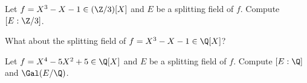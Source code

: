 \begin{exercise}
\label{xca:dec field of X^3-X-1 over Z3}
    Let $f=X^3-X-1\in (\Z/3)[X]$ and $E$ be a splitting field of $f$. 
    Compute $[E:\Z/3]$. 
\end{exercise}

What about the splitting field of $f=X^3-X-1\in \Q[X]$?

\begin{exercise}
\label{xca:dec field X^4-5X^2+5}
    Let $f=X^4-5X^2+5\in \Q[X]$ and $E$ be a splitting field of $f$. 
    Compute $[E:\Q]$ and $\Gal(E/\Q)$. 
\end{exercise}



